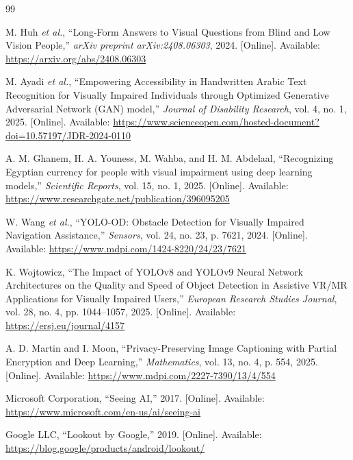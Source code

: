 \documentclass[a4paper]{report}
\begin{document}
\begin{thebibliography}{99}

M. Huh \textit{et al.}, ``Long-Form Answers to Visual Questions from Blind and Low Vision People,'' \textit{arXiv preprint arXiv:2408.06303}, 2024. [Online]. Available: \url{https://arxiv.org/abs/2408.06303}

M. Ayadi \textit{et al.}, ``Empowering Accessibility in Handwritten Arabic Text Recognition for Visually Impaired Individuals through Optimized Generative Adversarial Network (GAN) model,'' \textit{Journal of Disability Research}, vol. 4, no. 1, 2025. [Online]. Available: \url{https://www.scienceopen.com/hosted-document?doi=10.57197/JDR-2024-0110}

A. M. Ghanem, H. A. Youness, M. Wahba, and H. M. Abdelaal, ``Recognizing Egyptian currency for people with visual impairment using deep learning models,'' \textit{Scientific Reports}, vol. 15, no. 1, 2025. [Online]. Available: \url{https://www.researchgate.net/publication/396095205}

W. Wang \textit{et al.}, ``YOLO-OD: Obstacle Detection for Visually Impaired Navigation Assistance,'' \textit{Sensors}, vol. 24, no. 23, p. 7621, 2024. [Online]. Available: \url{https://www.mdpi.com/1424-8220/24/23/7621}

K. Wojtowicz, ``The Impact of YOLOv8 and YOLOv9 Neural Network Architectures on the Quality and Speed of Object Detection in Assistive VR/MR Applications for Visually Impaired Users,'' \textit{European Research Studies Journal}, vol. 28, no. 4, pp. 1044--1057, 2025. [Online]. Available: \url{https://ersj.eu/journal/4157}

A. D. Martin and I. Moon, ``Privacy-Preserving Image Captioning with Partial Encryption and Deep Learning,'' \textit{Mathematics}, vol. 13, no. 4, p. 554, 2025. [Online]. Available: \url{https://www.mdpi.com/2227-7390/13/4/554}

Microsoft Corporation, ``Seeing AI,'' 2017. [Online]. Available: \url{https://www.microsoft.com/en-us/ai/seeing-ai}

Google LLC, ``Lookout by Google,'' 2019. [Online]. Available: \url{https://blog.google/products/android/lookout/}


\end{thebibliography}
\end{document}
